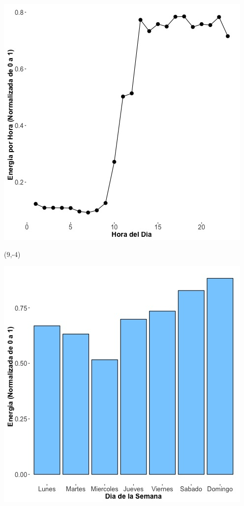 \documentclass{article}\usepackage[]{graphicx}\usepackage[]{color}
\newenvironment{knitrout}{}{} %
\begin{document}
\begin{knitrout}
\color{fgcolor}
\includegraphics[scale=0.65]{figure/A11_plot_norm_median} 
\end{knitrout}


 \begin{textblock}{1}(9,-4)
\begin{minipage}{20em}
\begingroup

\endgroup
\end{minipage}
\end{textblock}


\begin{knitrout}
\color{fgcolor}
\includegraphics[scale=0.65]{figure/A11_day_of_week_plot} 
\end{knitrout}
\end{document}
